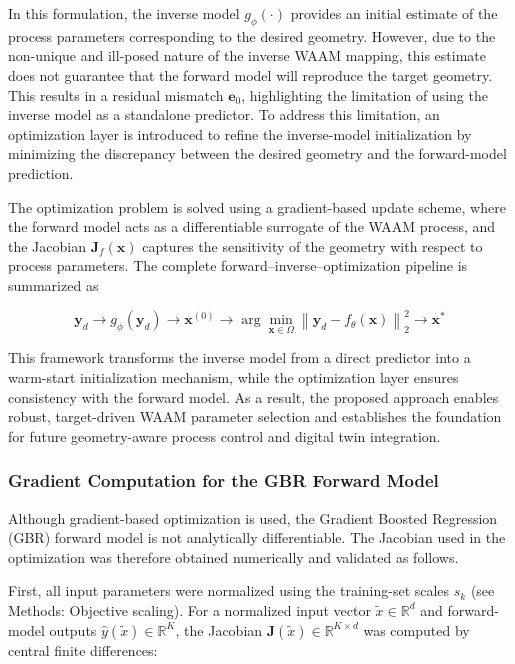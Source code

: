 \documentclass[11pt]{article}
\begin{document}
In this formulation, the inverse model $g_{\phi}(\cdot)$ provides an initial estimate of the process parameters corresponding to the desired geometry. However, due to the non-unique and ill-posed nature of the inverse WAAM mapping, this estimate does not guarantee that the forward model will reproduce the target geometry. This results in a residual mismatch $\mathbf{e}_0$, highlighting the limitation of using the inverse model as a standalone predictor. To address this limitation, an optimization layer is introduced to refine the inverse-model initialization by minimizing the discrepancy between the desired geometry and the forward-model prediction. 

The optimization problem is solved using a gradient-based update scheme, where the forward model acts as a differentiable surrogate of the WAAM process, and the Jacobian $\mathbf{J}_f(\mathbf{x})$ captures the sensitivity of the geometry with respect to process parameters. The complete forward--inverse--optimization pipeline is summarized as

\begin{equation}\label{Eq:11}
\boxed{
\mathbf{y}_d
\rightarrow
g_{\phi}(\mathbf{y}_d)
\rightarrow
\mathbf{x}^{(0)}
\rightarrow
\arg\min_{\mathbf{x}\in\Omega}
\left\|
\mathbf{y}_d - f_{\theta}(\mathbf{x})
\right\|_2^2
\rightarrow
\mathbf{x}^{*}
}
\end{equation}

This framework transforms the inverse model from a direct predictor into a warm-start initialization mechanism, while the optimization layer ensures consistency with the forward model. As a result, the proposed approach enables robust, target-driven WAAM parameter selection and establishes the foundation for future geometry-aware process control and digital twin integration.
\subsubsection*{Gradient Computation for the GBR Forward Model}

Although gradient-based optimization is used, the Gradient Boosted Regression (GBR) forward model is not analytically differentiable. The Jacobian used in the optimization was therefore obtained numerically and validated as follows.

First, all input parameters were normalized using the training-set scales \(s_k\) (see Methods: Objective scaling). For a normalized input vector \(\tilde{x}\in\mathbb{R}^d\) and forward-model outputs \(\hat{y}(\tilde{x})\in\mathbb{R}^K\), the Jacobian \(\mathbf{J}(\tilde{x})\in\mathbb{R}^{K\times d}\) was computed by central finite differences:
\end{document}

